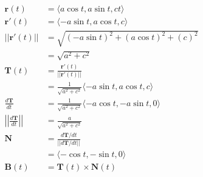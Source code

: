\documentclass{article}
\begin{document}
\setcounter{subsubsection}{2}
\subsubsection{}

\begin{align*}
  \mathbf{r}(t)                                      & = \langle a \cos t, a \sin t, c t \rangle                                                                                \\
  \mathbf{r}'(t)                                     & = \langle -a \sin t, a \cos t, c \rangle                                                                                 \\
  ||\mathbf{r}'(t)||                                 & = \sqrt{(-a \sin t)^2 + (a \cos t)^2 + (c)^2}                                                                            \\
                                                     & = \sqrt{a^2 + c^2}                                                                                                       \\
  \mathbf{T}(t)                                      & = \frac{\mathbf{r}'(t)}{||\mathbf{r}'(t)||}                                                                              \\
                                                     & = \frac{1}{\sqrt{a^2 + c^2}} \langle -a \sin t, a \cos t, c \rangle                                                      \\
  \frac{d \mathbf{T}}{d t}                           & = \frac{1}{\sqrt{a^2 + c^2}} \langle -a \cos t, -a \sin t, 0 \rangle                                                     \\
  \left|\left|\frac{d \mathbf{T}}{d t}\right|\right| & = \frac{a}{\sqrt{a^2 + c^2}}                                                                                             \\
  \mathbf{N}                                         & = \frac{d \mathbf{T} / d t}{||d \mathbf{T} / d t||}                                                                      \\
                                                     & = \langle -\cos t, -\sin t, 0 \rangle                                                                                    \\
  \mathbf{B}(t)                                      & = \mathbf{T}(t) \times \mathbf{N}(t)                                                                                     \\

\end{align*}
\end{document}
